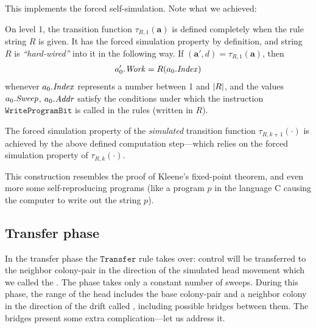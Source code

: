 \documentclass[11pt]{memoir}
\theoremstyle{definition} %
\renewcommand{\vek}[1]{\mathbf{#1}}
\newcommand{\fld}[1]{\ensuremath{\textit{#1\/}}}
\newcommand{\rul}[1]{\ensuremath{\texttt{#1}}}
\newcommand{\va}{\vek{a}} %
\newcommand{\TransferSw}{\mathrm{TransferSw}}
\newcommand{\Addr}{\fld{Addr}}
\newcommand{\Index}{\fld{Index}}
\newcommand{\Sweep}{\fld{Sweep}} %
\newcommand{\Work}{\fld{Work}} %
\newcommand{\Transfer}{\rul{Transfer}}
\newcommand{\WriteProgramBit}{\rul{WriteProgramBit}}
\begin{document}
This implements the forced self-simulation.
Note what we achieved:

\begin{itemize}
  \begin{sloppypar}
\item On level 1, the transition function \( \tau_{R,1}(\va) \) is defined completely
when the rule string \( R \) is given.
It has the forced simulation property by definition, and
string \( R \) is \emph{``hard-wired''} into it in the following way.
If \( (\va',d)=\tau_{R,1}(\va) \), then
\begin{align*}
  a'_{0}.\Work=R(a_{0}.\Index)
\end{align*}
whenever \( a_{0}.\Index \) represents a number between 1 and \( \lvert R \rvert \),
and the values \( a_{0}.\Sweep \), \( a_{0}.\Addr \) satisfy the conditions
under which the instruction \( \WriteProgramBit \) is 
called in the rules (written in \( R \)).
      \end{sloppypar}

      \begin{sloppypar}
\item The forced simulation property of the \emph{simulated}
transition function \( \tau_{R,k+1}(\cdot) \) is 
achieved by the above defined computation 
step---which relies on the forced simulation property of \( \tau_{R,k}(\cdot) \).
              \end{sloppypar}
\end{itemize}

\begin{remark}
  This construction resembles the proof of Kleene's fixed-point theorem, and even more
  some self-reproducing programs (like a program \( p \) in the language C causing the computer
  to write out the string \( p \)).
\end{remark}

\subsection{Transfer phase}\label{sec:TransferPhase}

In the transfer phase the \( \Transfer \) rule takes over: control will be transferred to the
neighbor colony-pair in the direction of the simulated head movement which we called 
the .
The phase takes only a constant number of sweeps.
During this phase, the range of the head
includes the base colony-pair and a neighbor colony
in the direction of the drift called , including possible bridges between them.
The bridges present some extra complication---let us address it.
\end{document}
